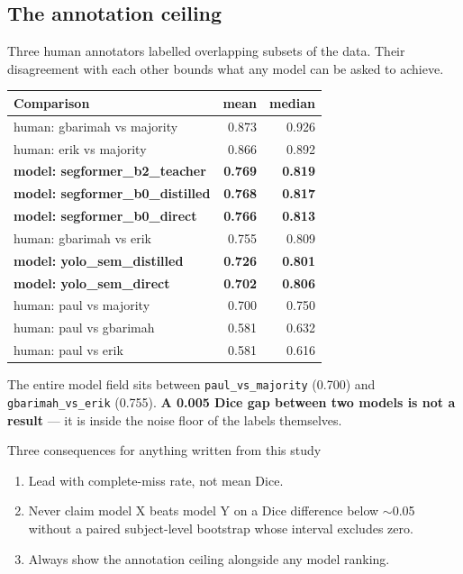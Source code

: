 \documentclass[11pt]{article}
\begin{document}
\subsection{The annotation ceiling}

Three human annotators labelled overlapping subsets of the data. Their
disagreement with each other bounds what any model can be asked to achieve.

\begin{center}
\begin{tabular}{Lnn}
\toprule
\textbf{Comparison} & \textbf{mean} & \textbf{median} \\
\midrule
human: gbarimah vs majority & 0.873 & 0.926 \\
human: erik vs majority & 0.866 & 0.892 \\
\textbf{model: segformer\_b2\_teacher} & \textbf{0.769} & \textbf{0.819} \\
\textbf{model: segformer\_b0\_distilled} & \textbf{0.768} & \textbf{0.817} \\
\textbf{model: segformer\_b0\_direct} & \textbf{0.766} & \textbf{0.813} \\
human: gbarimah vs erik & 0.755 & 0.809 \\
\textbf{model: yolo\_sem\_distilled} & \textbf{0.726} & \textbf{0.801} \\
\textbf{model: yolo\_sem\_direct} & \textbf{0.702} & \textbf{0.806} \\
human: paul vs majority & 0.700 & 0.750 \\
human: paul vs gbarimah & 0.581 & 0.632 \\
human: paul vs erik & 0.581 & 0.616 \\
\bottomrule
\end{tabular}
\end{center}

The entire model field sits between \texttt{paul\_vs\_majority} (0.700) and
\texttt{gbarimah\_vs\_erik} (0.755). \textbf{A 0.005 Dice gap between two models
is not a result} --- it is inside the noise floor of the labels themselves.

\begin{keybox}{Three consequences for anything written from this study}
\begin{enumerate}[leftmargin=*,itemsep=1pt]
\item Lead with complete-miss rate, not mean Dice.
\item Never claim model X beats model Y on a Dice difference below $\sim$0.05
without a paired subject-level bootstrap whose interval excludes zero.
\item Always show the annotation ceiling alongside any model ranking.
\end{enumerate}
\end{keybox}
\end{document}
